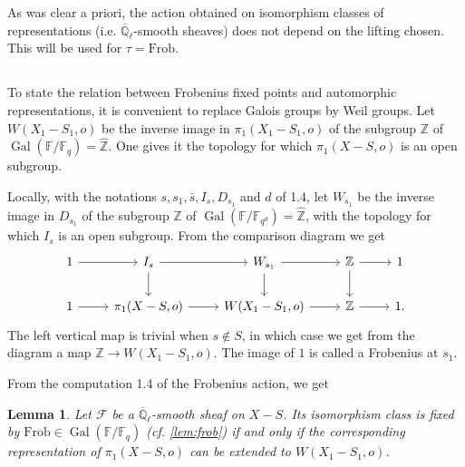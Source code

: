 \documentclass[11pt,a4paper]{article}
\theoremstyle{plain}
\newtheorem{lemma}[theorem]{Lemma}
\theoremstyle{definition}
\DeclareMathOperator{\Gal}{Gal}
\newcommand{\Ql}{\overline{\mathbb{Q}}_\ell}
\newcommand{\Fq}{\mathbb{F}_q}
\newcommand{\F}{\mathbb{F}}
\newcommand{\Z}{\mathbb{Z}}
\newcommand{\Frob}{\mathrm{Frob}}
\begin{document}
As was clear a priori, the action obtained on isomorphism classes of representations (i.e. $\Ql$-smooth sheaves) does not depend on the lifting chosen. This will be used for $\tau = \Frob$.

\subsection{}

To state the relation between Frobenius fixed points and automorphic representations, it is convenient to replace Galois groups by Weil groups. Let $W(X_1 - S_1, o)$ be the inverse image in $\pi_1(X_1 - S_1, o)$ of the subgroup $\Z$ of $\Gal(\F/\Fq) = \hat{\Z}$. One gives it the topology for which $\pi_1(X - S, o)$ is an open subgroup.

Locally, with the notations $s, s_1, \bar{s}, I_s, D_{s_1}$ and $d$ of 1.4, let $W_{s_1}$ be the inverse image in $D_{s_1}$ of the subgroup $\Z$ of $\Gal(\F/\F_{q^d}) = \hat{\Z}$, with the topology for which $I_s$ is an open subgroup. From the comparison diagram we get
\begin{equation}
\begin{tikzcd}
1 \arrow[r] & I_s \arrow[r] \arrow[d] & W_{s_1} \arrow[r] \arrow[d] & \Z \arrow[r] \arrow[d] & 1 \\
1 \arrow[r] & \pi_1(X - S, o) \arrow[r] & W(X_1 - S_1, o) \arrow[r] & \Z \arrow[r] & 1.
\end{tikzcd}
\end{equation}
The left vertical map is trivial when $s \notin S$, in which case we get from the diagram a map $\Z \to W(X_1 - S_1, o)$. The image of $1$ is called a Frobenius at $s_1$.

From the computation 1.4 of the Frobenius action, we get

\begin{lemma}\label{lem:weil}
Let $\mathcal{F}$ be a $\Ql$-smooth sheaf on $X - S$. Its isomorphism class is fixed by $\Frob \in \Gal(\F/\Fq)$ (cf. \ref{lem:frob}) if and only if the corresponding representation of $\pi_1(X - S, o)$ can be extended to $W(X_1 - S_1, o)$.
\end{lemma}

\subsection{}
\end{document}
